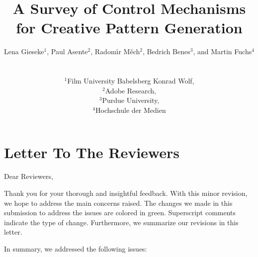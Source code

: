 \documentclass{egpubl}
\title[A Survey of Control Mechanisms for Creative Pattern Generation]%
      {A Survey of Control Mechanisms for Creative Pattern Generation}
\author[L. Gieseke, P. Asente, R. Mech, B. Benes, M. Fuchs]
{\parbox{\textwidth}{\centering Lena Gieseke$^{1}$, Paul Asente$^{2}$, Radom\'{\i}r M\v{e}ch$^{2}$, Bedrich Benes$^{3}$, and Martin Fuchs$^{4}$}
        \\
{\parbox{\textwidth}{\centering $^1$Film University Babelsberg Konrad Wolf,\\
         $^2$Adobe Research,\\
         $^3$Purdue University,\\
         $^4$Hochschule der Medien
       }
}
}
\begin{document}
\onecolumn %



\maketitle




\section*{Letter To The Reviewers}

Dear Reviewers,


Thank you for your thorough and insightful feedback. With this minor revision, we hope to address the main concerns raised. The changes we made in this submission to address the issues are colored in green. Superscript comments indicate the type of change. Furthermore, we summarize our revisions in this letter.

In summary, we addressed the following issues:


\end{document}
